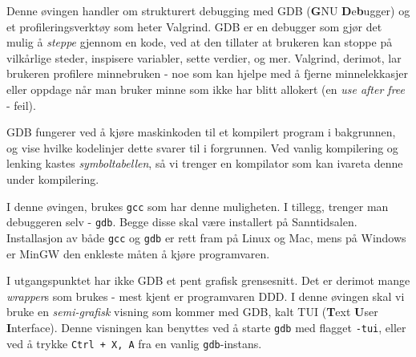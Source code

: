\begin{alphasection}
Denne øvingen handler om strukturert debugging med GDB (\textbf{G}NU \textbf{D}e\textbf{b}ugger) og et profileringsverktøy som heter Valgrind. GDB er en debugger som gjør det mulig å \textit{steppe} gjennom en kode, ved at den tillater at brukeren kan stoppe på vilkårlige steder, inspisere variabler, sette verdier, og mer. Valgrind, derimot, lar brukeren profilere minnebruken - noe som kan hjelpe med å fjerne minnelekkasjer eller oppdage når man bruker minne som ikke har blitt allokert (en \textit{use after free} - feil).


GDB fungerer ved å kjøre maskinkoden til et kompilert program i bakgrunnen, og vise hvilke kodelinjer dette svarer til i forgrunnen. Ved vanlig kompilering og lenking kastes \textit{symboltabellen}, så vi trenger en kompilator som kan ivareta denne under kompilering.

I denne øvingen, brukes \verb|gcc| som har denne muligheten. I tillegg, trenger man debuggeren selv - \verb|gdb|. Begge disse skal være installert på Sanntidsalen. Installasjon av både \verb|gcc| og \verb|gdb| er rett fram på Linux og Mac, mens på Windows er MinGW den enkleste måten å kjøre programvaren.

I utgangspunktet har ikke GDB et pent grafisk grensesnitt. Det er derimot mange \textit{wrapper}s som brukes - mest kjent er programvaren DDD. I denne øvingen skal vi bruke en \textit{semi-grafisk} visning som kommer med GDB, kalt TUI (\textbf{T}ext \textbf{U}ser \textbf{I}nterface). Denne visningen kan benyttes ved å starte \verb|gdb| med flagget \verb|-tui|, eller ved å trykke \verb|Ctrl + X, A| fra en vanlig \verb|gdb|-instans.



\end{alphasection}

